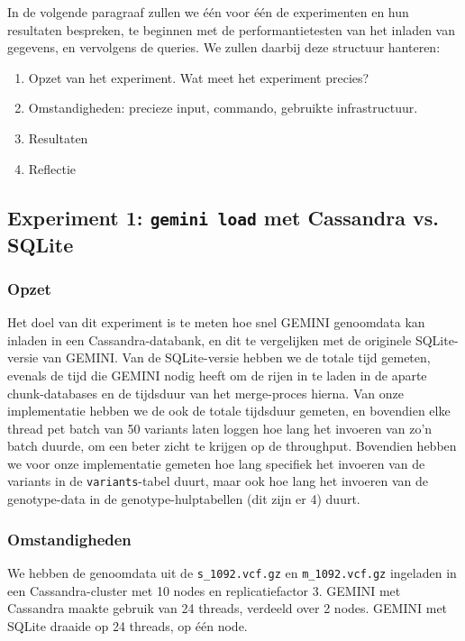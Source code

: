 In de volgende paragraaf zullen we \'e\'en voor \'e\'en de experimenten en hun resultaten bespreken, te beginnen met de performantietesten van het inladen van gegevens, en vervolgens de queries. We zullen daarbij deze structuur hanteren:
\begin{enumerate}
\item Opzet van het experiment. Wat meet het experiment precies?
\item Omstandigheden: precieze input, commando, gebruikte infrastructuur.
\item Resultaten
\item Reflectie
\end{enumerate}

\subsection{Experiment 1: \texttt{gemini load} met Cassandra vs. SQLite}
\label{exp1}

\subsubsection{Opzet}

Het doel van dit experiment is te meten hoe snel GEMINI genoomdata kan inladen in een Cassandra-databank, en dit te vergelijken met de originele SQLite-versie van GEMINI. Van de SQLite-versie hebben we de totale tijd gemeten, evenals de tijd die GEMINI nodig heeft om de rijen in te laden in de aparte chunk-databases en de tijdsduur van het merge-proces hierna. Van onze implementatie hebben we de ook de totale tijdsduur gemeten, en bovendien elke thread pet batch van 50 variants laten loggen hoe lang het invoeren van zo'n batch duurde, om een beter zicht te krijgen op de throughput. Bovendien hebben we voor onze implementatie gemeten hoe lang specifiek het invoeren van de variants in de \texttt{variants}-tabel duurt, maar ook hoe lang het invoeren van de genotype-data in de genotype-hulptabellen (dit zijn er 4) duurt. 

\subsubsection{Omstandigheden}
We hebben de genoomdata uit de \texttt{s\_1092.vcf.gz} en \texttt{m\_1092.vcf.gz} ingeladen in een Cassandra-cluster met 10 nodes en replicatiefactor 3. GEMINI met Cassandra maakte gebruik van 24 threads, verdeeld over 2 nodes. GEMINI met SQLite draaide op 24 threads, op \'e\'en node.

